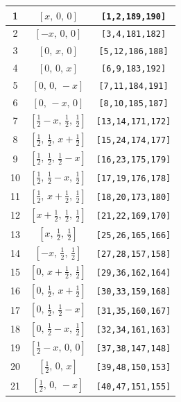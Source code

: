 \documentclass[fleqn,8pt]{jsarticle}
\begin{document}
\begin{longtable}{ccc}
1 & $\left[ x,\, 0,\, 0 \right]$ & {\tt [1,2,189,190]} \\ \hline
2 & $\left[ - x,\, 0,\, 0 \right]$ & {\tt [3,4,181,182]} \\ \hline
3 & $\left[ 0,\, x,\, 0 \right]$ & {\tt [5,12,186,188]} \\ \hline
4 & $\left[ 0,\, 0,\, x \right]$ & {\tt [6,9,183,192]} \\ \hline
5 & $\left[ 0,\, 0,\, - x \right]$ & {\tt [7,11,184,191]} \\ \hline
6 & $\left[ 0,\, - x,\, 0 \right]$ & {\tt [8,10,185,187]} \\ \hline
7 & $\left[ \frac{1}{2} - x,\, \frac{1}{2},\, \frac{1}{2} \right]$ & {\tt [13,14,171,172]} \\ \hline
8 & $\left[ \frac{1}{2},\, \frac{1}{2},\, x + \frac{1}{2} \right]$ & {\tt [15,24,174,177]} \\ \hline
9 & $\left[ \frac{1}{2},\, \frac{1}{2},\, \frac{1}{2} - x \right]$ & {\tt [16,23,175,179]} \\ \hline
10 & $\left[ \frac{1}{2},\, \frac{1}{2} - x,\, \frac{1}{2} \right]$ & {\tt [17,19,176,178]} \\ \hline
11 & $\left[ \frac{1}{2},\, x + \frac{1}{2},\, \frac{1}{2} \right]$ & {\tt [18,20,173,180]} \\ \hline
12 & $\left[ x + \frac{1}{2},\, \frac{1}{2},\, \frac{1}{2} \right]$ & {\tt [21,22,169,170]} \\ \hline
13 & $\left[ x,\, \frac{1}{2},\, \frac{1}{2} \right]$ & {\tt [25,26,165,166]} \\ \hline
14 & $\left[ - x,\, \frac{1}{2},\, \frac{1}{2} \right]$ & {\tt [27,28,157,158]} \\ \hline
15 & $\left[ 0,\, x + \frac{1}{2},\, \frac{1}{2} \right]$ & {\tt [29,36,162,164]} \\ \hline
16 & $\left[ 0,\, \frac{1}{2},\, x + \frac{1}{2} \right]$ & {\tt [30,33,159,168]} \\ \hline
17 & $\left[ 0,\, \frac{1}{2},\, \frac{1}{2} - x \right]$ & {\tt [31,35,160,167]} \\ \hline
18 & $\left[ 0,\, \frac{1}{2} - x,\, \frac{1}{2} \right]$ & {\tt [32,34,161,163]} \\ \hline
19 & $\left[ \frac{1}{2} - x,\, 0,\, 0 \right]$ & {\tt [37,38,147,148]} \\ \hline
20 & $\left[ \frac{1}{2},\, 0,\, x \right]$ & {\tt [39,48,150,153]} \\ \hline
21 & $\left[ \frac{1}{2},\, 0,\, - x \right]$ & {\tt [40,47,151,155]} \\ \hline

\end{longtable}
\end{document}
